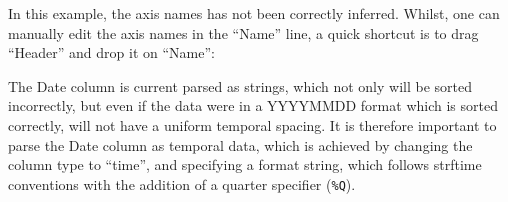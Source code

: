 \begin{center}
\end{center}

In this example, the axis names has not been correctly
inferred. Whilst, one can manually edit the axis names in the ``Name''
line, a quick shortcut is to drag ``Header'' and drop it on ``Name'':

The Date column is current parsed as strings, which not only will be
sorted incorrectly, but even if the data were in a YYYYMMDD format
which is sorted correctly, will not have a uniform temporal
spacing. It is therefore important to parse the Date column as
temporal data, which is achieved by changing the column type to
``time'', and specifying a format string, which follows strftime
conventions with the addition of a quarter specifier (\verb+%Q+).
\label{strftime format specifier}

\begin{center}
\end{center}

